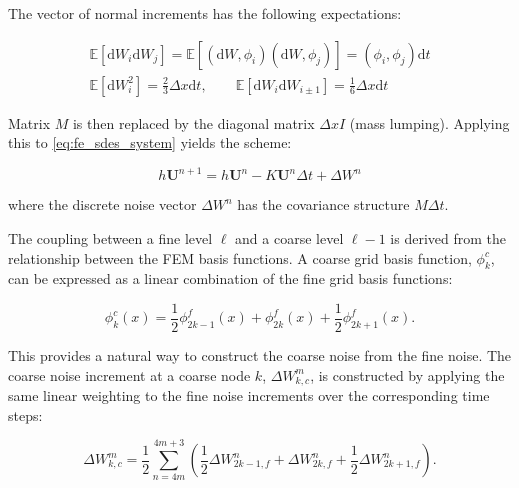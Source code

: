 The vector of normal increments has the following expectations:

\begin{align*}
    \mathbb{E}[\mathrm{d}W_i \mathrm{d}W_j] = \mathbb{E}[(\mathrm{d}W, \phi_i) 
    (\mathrm{d}W, \phi_j)] = (\phi_i, \phi_j)\mathrm{d}t\\
    \mathbb{E}[\mathrm{d}W_i^2] = \frac{2}{3}\Delta x \mathrm{d}t, \qquad 
    \mathbb{E}[\mathrm{d}W_i \mathrm{d}W_{i\pm 1}] = \frac{1}{6} \Delta x \mathrm{d}t
\end{align*}


Matrix $M$ is then replaced by the diagonal matrix $\Delta x I$ (mass lumping). 
Applying this to \eqref{eq:fe_sdes_system} yields the scheme:

\begin{equation*}
    h\mathbf{U}^{n+1} = h\mathbf{U}^n - K \mathbf{U}^n \Delta t + \Delta W^n
\end{equation*}

where the discrete noise vector $\Delta W^n$ has the covariance structure 
$M \Delta t$.

The coupling between a fine level $\ell$ and a coarse level $\ell-1$ is derived 
from the relationship between the FEM basis functions. A coarse grid basis 
function, $\phi_k^c$, can be expressed as a linear combination of the fine grid basis functions:

\begin{equation*}
    \phi_k^c(x) = \frac{1}{2} \phi_{2k-1}^f(x) + \phi_{2k}^f(x) + \frac{1}{2}\phi_{2k+1}^f(x).
\end{equation*}

This provides a natural way to construct the coarse noise from the fine noise. The coarse
noise increment at a coarse node $k$, $\Delta W_{k,c}^m$, is constructed by applying the same 
linear weighting to the fine noise increments over the corresponding time steps: 

\begin{equation}\label{eq:fe_coupling_eqn}
    \Delta W_{k,c}^m = \frac{1}{2} \sum_{n=4m}^{4m+3} \left( 
        \frac{1}{2}\Delta W_{2k-1,f}^n + \Delta W_{2k,f}^n + 
        \frac{1}{2}\Delta W_{2k+1,f}^n \right).
\end{equation}
